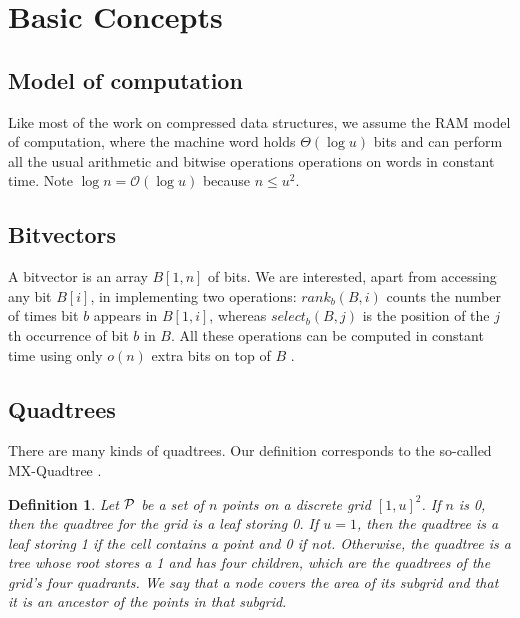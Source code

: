 \documentclass{elsarticle}
\newtheorem{definition}{Definition}
\newcommand{\Oh}[1]
  {\ensuremath{\mathcal{O}\!\left( {#1} \right)}}
\begin{document}
\section{Basic Concepts}
\label{sec:related}

\subsection{Model of computation}

Like most of the work on compressed data structures, we assume the RAM model of computation, where the machine word holds $\Theta(\log u)$ bits and can perform all the usual arithmetic and bitwise operations operations on words in constant time. Note $\log n = \Oh{\log u}$ because $n \le u^2$.

\subsection{Bitvectors}

A bitvector is an array $B[1,n]$ of bits. We are interested, apart from accessing any bit $B[i]$, in implementing two operations: $rank_b(B,i)$ counts the number of times bit $b$ appears in $B[1,i]$, whereas $select_b(B,j)$ is the position of the $j$th occurrence of bit $b$ in $B$. All these operations can be computed in constant time using only $o(n)$ extra bits on top of $B$ \cite{Cla96,Mun96}.

\subsection{Quadtrees} \label{sec:quadtrees}

There are many kinds of quadtrees. Our definition corresponds to the so-called 
MX-Quadtree \cite{WF90,Sam06}.

\begin{definition}
Let $\cal P$ be a set of $n$ points on a discrete grid $[1,u]^2$. If $n$ is 0, 
then the quadtree for the grid is a leaf storing 0. If $u=1$, then the 
quadtree is a leaf storing 1 if the cell contains a point and 0 if not.
Otherwise, the quadtree is a tree whose root stores a 1 
and has four children, which are the quadtrees of the grid's four quadrants.
We say that a node {\em covers} the area of its subgrid and that it is an 
{\em ancestor} of the points in that subgrid.
\end{definition}
\end{document}

